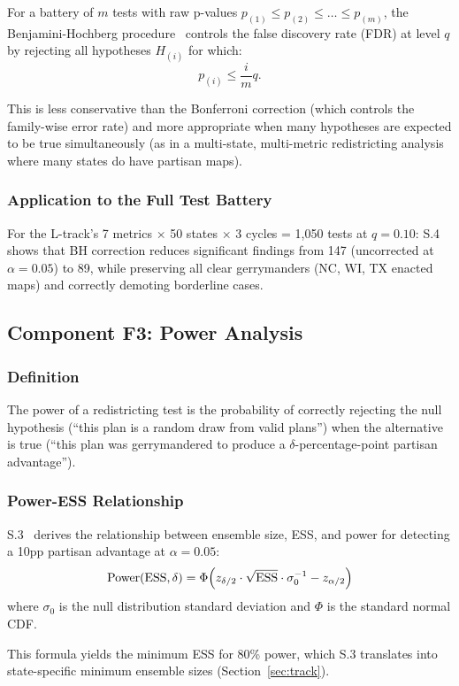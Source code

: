 For a battery of $m$ tests with raw p-values $p_{(1)} \leq p_{(2)} \leq
\ldots \leq p_{(m)}$, the Benjamini-Hochberg procedure~\citep{bh1995} controls
the false discovery rate (FDR) at level $q$ by rejecting all hypotheses
$H_{(i)}$ for which:
\[
  p_{(i)} \leq \frac{i}{m} q.
\]

This is less conservative than the Bonferroni correction (which controls
the family-wise error rate) and more appropriate when many hypotheses
are expected to be true simultaneously (as in a multi-state, multi-metric
redistricting analysis where many states do have partisan maps).

\subsubsection{Application to the Full Test Battery}

For the L-track's 7 metrics $\times$ 50 states $\times$ 3 cycles = 1,050 tests
at $q = 0.10$:
S.4~\citep{s4paper} shows that BH correction reduces significant findings
from 147 (uncorrected at $\alpha = 0.05$) to 89, while preserving all
clear gerrymanders (NC, WI, TX enacted maps) and correctly demoting
borderline cases.

\subsection{Component F3: Power Analysis}

\subsubsection{Definition}

The power of a redistricting test is the probability of correctly
rejecting the null hypothesis (``this plan is a random draw from valid plans'')
when the alternative is true (``this plan was gerrymandered to produce a
$\delta$-percentage-point partisan advantage'').

\subsubsection{Power-ESS Relationship}

S.3~\citep{s3paper} derives the relationship between ensemble size,
ESS, and power for detecting a 10pp partisan advantage at $\alpha = 0.05$:
\[
  \text{Power}(\mathrm{ESS}, \delta) = \Phi\!\left(
    z_{\delta/2} \cdot \sqrt{\mathrm{ESS}} \cdot \sigma_0^{-1} - z_{\alpha/2}
  \right)
\]
where $\sigma_0$ is the null distribution standard deviation and
$\Phi$ is the standard normal CDF.

This formula yields the minimum ESS for 80\% power, which S.3 translates
into state-specific minimum ensemble sizes (Section~\ref{sec:track}).
